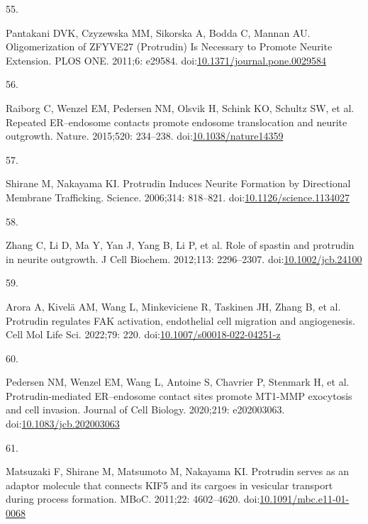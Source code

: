 \documentclass[
  12pt,
  a4paper,
]{book}
\newlength{\cslhangindent}
\newlength{\csllabelwidth}
\newenvironment{CSLReferences}[2] %
 {\begin{list}{}{%
  \setlength{\itemindent}{0pt}
  \setlength{\leftmargin}{0pt}
  \setlength{\parsep}{0pt}
  \ifodd #1
   \setlength{\leftmargin}{\cslhangindent}
   \setlength{\itemindent}{-1\cslhangindent}
  \fi
  \setlength{\itemsep}{#2\baselineskip}}}
 {\end{list}}
\newcommand{\CSLLeftMargin}[1]{\parbox[t]{\csllabelwidth}{\strut#1\strut}}
\newcommand{\CSLRightInline}[1]{\parbox[t]{\linewidth - \csllabelwidth}{\strut#1\strut}}
\begin{document}
\begin{CSLReferences}{0}{1}
\CSLLeftMargin{55. }%
\CSLRightInline{Pantakani DVK, Czyzewska MM, Sikorska A, Bodda C, Mannan AU. Oligomerization of {ZFYVE27} ({Protrudin}) {Is Necessary} to {Promote Neurite Extension}. PLOS ONE. 2011;6: e29584. doi:\href{https://doi.org/10.1371/journal.pone.0029584}{10.1371/journal.pone.0029584}}

\CSLLeftMargin{56. }%
\CSLRightInline{Raiborg C, Wenzel EM, Pedersen NM, Olsvik H, Schink KO, Schultz SW, et al. Repeated {ER}--endosome contacts promote endosome translocation and neurite outgrowth. Nature. 2015;520: 234--238. doi:\href{https://doi.org/10.1038/nature14359}{10.1038/nature14359}}

\CSLLeftMargin{57. }%
\CSLRightInline{Shirane M, Nakayama KI. Protrudin {Induces Neurite Formation} by {Directional Membrane Trafficking}. Science. 2006;314: 818--821. doi:\href{https://doi.org/10.1126/science.1134027}{10.1126/science.1134027}}

\CSLLeftMargin{58. }%
\CSLRightInline{Zhang C, Li D, Ma Y, Yan J, Yang B, Li P, et al. Role of spastin and protrudin in neurite outgrowth. J Cell Biochem. 2012;113: 2296--2307. doi:\href{https://doi.org/10.1002/jcb.24100}{10.1002/jcb.24100}}

\CSLLeftMargin{59. }%
\CSLRightInline{Arora A, Kivelä AM, Wang L, Minkeviciene R, Taskinen JH, Zhang B, et al. Protrudin regulates {FAK} activation, endothelial cell migration and angiogenesis. Cell Mol Life Sci. 2022;79: 220. doi:\href{https://doi.org/10.1007/s00018-022-04251-z}{10.1007/s00018-022-04251-z}}

\CSLLeftMargin{60. }%
\CSLRightInline{Pedersen NM, Wenzel EM, Wang L, Antoine S, Chavrier P, Stenmark H, et al. Protrudin-mediated {ER}--endosome contact sites promote {MT1-MMP} exocytosis and cell invasion. Journal of Cell Biology. 2020;219: e202003063. doi:\href{https://doi.org/10.1083/jcb.202003063}{10.1083/jcb.202003063}}

\CSLLeftMargin{61. }%
\CSLRightInline{Matsuzaki F, Shirane M, Matsumoto M, Nakayama KI. Protrudin serves as an adaptor molecule that connects {KIF5} and its cargoes in vesicular transport during process formation. MBoC. 2011;22: 4602--4620. doi:\href{https://doi.org/10.1091/mbc.e11-01-0068}{10.1091/mbc.e11-01-0068}}


\end{CSLReferences}
\end{document}
